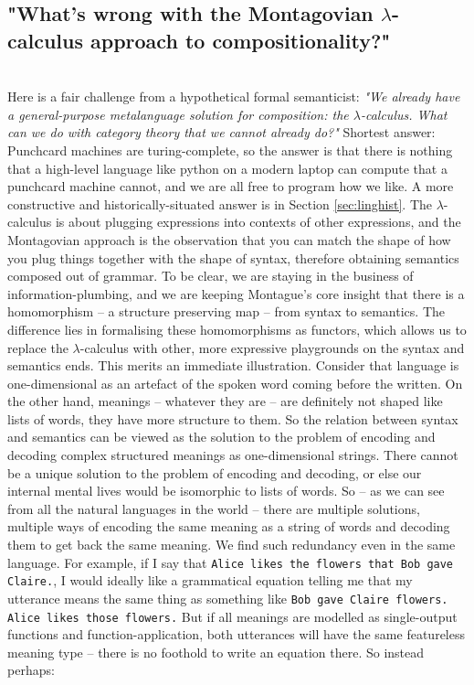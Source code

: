\subsection{"What's wrong with the Montagovian $\lambda$-calculus approach to compositionality?"}\\
Here is a fair challenge from a hypothetical formal semanticist: \emph{"We already have a general-purpose metalanguage solution for composition: the $\lambda$-calculus. What can we do with category theory that we cannot already do?"} Shortest answer: Punchcard machines are turing-complete, so the answer is that there is nothing that a high-level language like python on a modern laptop can compute that a punchcard machine cannot, and we are all free to program how we like. A more constructive and historically-situated answer is in Section \ref{sec:linghist}. The $\lambda$-calculus is about plugging expressions into contexts of other expressions, and the Montagovian approach is the observation that you can match the shape of how you plug things together with the shape of syntax, therefore obtaining semantics composed out of grammar. To be clear, we are staying in the business of information-plumbing, and we are keeping Montague's core insight that there is a homomorphism -- a structure preserving map -- from syntax to semantics. The difference lies in formalising these homomorphisms as functors, which allows us to replace the $\lambda$-calculus with other, more expressive playgrounds on the syntax and semantics ends. This merits an immediate illustration. Consider that language is one-dimensional as an artefact of the spoken word coming before the written. On the other hand, meanings -- whatever they are -- are definitely not shaped like lists of words, they have more structure to them. So the relation between syntax and semantics can be viewed as the solution to the problem of encoding and decoding complex structured meanings as one-dimensional strings. There cannot be a unique solution to the problem of encoding and decoding, or else our internal mental lives would be isomorphic to lists of words. So -- as we can see from all the natural languages in the world -- there are multiple solutions, multiple ways of encoding the same meaning as a string of words and decoding them to get back the same meaning. We find such redundancy even in the same language. For example, if I say that \texttt{Alice likes the flowers that Bob gave Claire.}, I would ideally like a grammatical equation telling me that my utterance means the same thing as something like \texttt{Bob gave Claire flowers. Alice likes those flowers.} But if all meanings are modelled as single-output functions and function-application, both utterances will have the same featureless meaning type -- there is no foothold to write an equation there. So instead perhaps:

